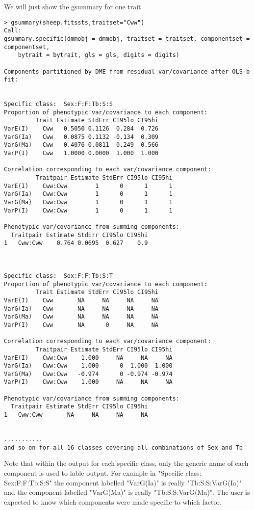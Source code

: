\documentclass[titlepage]{article}  %
\begin{document}
We will just show the gsummary for one trait
\begin{verbatim}
> gsummary(sheep.fitssts,traitset="Cww")
Call:
gsummary.specific(dmmobj = dmmobj, traitset = traitset, componentset = componentset, 
    bytrait = bytrait, gls = gls, digits = digits)

Components partitioned by DME from residual var/covariance after OLS-b fit:


Specific class:  Sex:F:F:Tb:S:S 
Proportion of phenotypic var/covariance to each component:
         Trait Estimate StdErr CI95lo CI95hi
VarE(I)    Cww   0.5050 0.1126  0.284  0.726
VarG(Ia)   Cww   0.0875 0.1132 -0.134  0.309
VarG(Ma)   Cww   0.4076 0.0811  0.249  0.566
VarP(I)    Cww   1.0000 0.0000  1.000  1.000

Correlation corresponding to each var/covariance component:
         Traitpair Estimate StdErr CI95lo CI95hi
VarE(I)    Cww:Cww        1      0      1      1
VarG(Ia)   Cww:Cww        1      0      1      1
VarG(Ma)   Cww:Cww        1      0      1      1
VarP(I)    Cww:Cww        1      0      1      1

Phenotypic var/covariance from summing components:
  Traitpair Estimate StdErr CI95lo CI95hi
1   Cww:Cww    0.764 0.0695  0.627    0.9



Specific class:  Sex:F:F:Tb:S:T 
Proportion of phenotypic var/covariance to each component:
         Trait Estimate StdErr CI95lo CI95hi
VarE(I)    Cww       NA     NA     NA     NA
VarG(Ia)   Cww       NA     NA     NA     NA
VarG(Ma)   Cww       NA     NA     NA     NA
VarP(I)    Cww       NA      0     NA     NA

Correlation corresponding to each var/covariance component:
         Traitpair Estimate StdErr CI95lo CI95hi
VarE(I)    Cww:Cww    1.000     NA     NA     NA
VarG(Ia)   Cww:Cww    1.000      0  1.000  1.000
VarG(Ma)   Cww:Cww   -0.974      0 -0.974 -0.974
VarP(I)    Cww:Cww    1.000     NA     NA     NA

Phenotypic var/covariance from summing components:
  Traitpair Estimate StdErr CI95lo CI95hi
1   Cww:Cww       NA     NA     NA     NA


...........
and so on for all 16 classes covering all combinations of Sex and Tb
\end{verbatim}
 Note that within the output for each specific class, only the generic name of each component is used to lable output. For example in "Specific class:  Sex:F:F:Tb:S:S" the component labelled "VarG(Ia)" is really "Tb:S:S:VarG(Ia)" and the component labelled "VarG(Ma)" is really "Tb:S:S:VarG(Ma)". The user is expected to know which components were made specific to which factor. 
\end{document}
